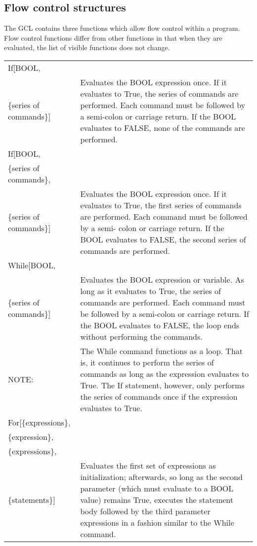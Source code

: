 \medskip

\subsection{Flow control structures}

The GCL contains three functions which allow flow control within a
program.  Flow control functions differ from other functions in that
when they are evaluated, the list of visible functions does not
change.

\medskip

\begin{tabular}{lp{4in}}
If[BOOL, & \\
\{series of commands\}] & Evaluates the BOOL expression
once. If it evaluates to True, the series of commands are performed.
Each command must be followed by a semi-colon or carriage return.  If
the BOOL evaluates to FALSE, none of the commands are performed.\\
If[BOOL, & \\
\{series of commands\}, & \\
\{series of commands\}] & Evaluates the BOOL expression
once. If it evaluates to True, the first series of commands are
performed.  Each command must be followed by a semi- colon or carriage
return.  If the BOOL evaluates to FALSE, the second series of
commands are performed. \\
While[BOOL, &\\
\{series of commands\}] & Evaluates the BOOL
expression or variable.  As long as it evaluates to True, the series
of commands are performed.  Each command must be followed by a
semi-colon or carriage return.  If the BOOL evaluates to FALSE, the
loop ends without performing the commands.\\
NOTE: & The While command functions as a
loop.  That is, it continues to perform the series of commands as long
as the expression evaluates to True.  The If statement, however, only
performs the series of commands once if the expression evaluates to
True.\\
For[\{expressions\}, & \\
\{expression\}, & \\
\{expressions\}, & \\
\{statements\}] & Evaluates the first set of expressions as initialization;
afterwards, so long as the second parameter (which must evaluate to a 
BOOL value) remains True, executes the statement body followed by the
third parameter expressions in a fashion similar to the While command.
\end{tabular}

